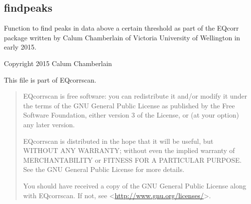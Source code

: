 \documentclass[a4paper,10pt,english]{sphinxmanual}
\begin{document}
\subsection{findpeaks}
\label{submodules/utils.findpeaks:module-findpeaks}\label{submodules/utils.findpeaks::doc}\label{submodules/utils.findpeaks:findpeaks}
Function to find peaks in data above a certain threshold as part of the EQcorr
package written by Calum Chamberlain of Victoria University of Wellington in
early 2015.

Copyright 2015 Calum Chamberlain

This file is part of EQcorrscan.
\begin{quote}

EQcorrscan is free software: you can redistribute it and/or modify
it under the terms of the GNU General Public License as published by
the Free Software Foundation, either version 3 of the License, or
(at your option) any later version.

EQcorrscan is distributed in the hope that it will be useful,
but WITHOUT ANY WARRANTY; without even the implied warranty of
MERCHANTABILITY or FITNESS FOR A PARTICULAR PURPOSE.  See the
GNU General Public License for more details.

You should have received a copy of the GNU General Public License
along with EQcorrscan.  If not, see \textless{}\href{http://www.gnu.org/licenses/}{http://www.gnu.org/licenses/}\textgreater{}.
\end{quote}
\end{document}

